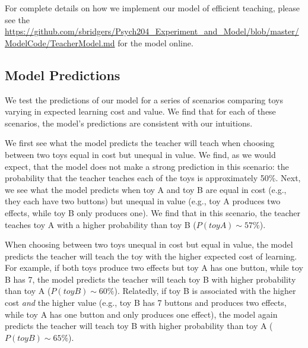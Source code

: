 \documentclass[10pt,letterpaper]{article}
\begin{document}
For complete details on how we implement our model of efficient teaching, please see the \url{https://github.com/sbridgers/Psych204_Experiment_and_Model/blob/master/ModelCode/TeacherModel.md} for the model online.

\subsection{Model Predictions}

We test the predictions of our model for a series of scenarios comparing toys varying in expected learning cost and value. We find that for each of these scenarios, the model's predictions are consistent with our intuitions. 

We first see what the model predicts the teacher will teach when choosing between two toys equal in cost but unequal in value. We find, as we would expect, that the model does not make a strong prediction in this scenario: the probability that the teacher teaches each of the toys is approximately 50\%. Next, we see what the model predicts when toy A and toy B are equal in cost (e.g., they each have two buttons) but unequal in value (e.g., toy A produces two effects, while toy B only produces one). We find that in this scenario, the teacher teaches toy A with a higher probability than toy B ($P(toyA) \sim 57\%$). 

When choosing between two toys unequal in cost but equal in value, the model predicts the teacher will teach the toy with the higher expected cost of learning. For example, if both toys produce two effects but toy A has one button, while toy B has 7, the model predicts the teacher will teach toy B with higher probability than toy A ($P(toyB) \sim 60\%$). Relatedly, if toy B is associated with the higher cost \textit{and} the higher value (e.g., toy B has 7 buttons and produces two effects, while toy A has one button and only produces one effect), the model again predicts the teacher will teach toy B with higher probability than toy A ($P(toyB) \sim 65\%$).
\end{document}
